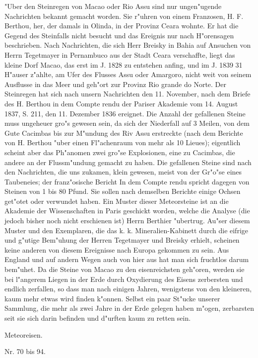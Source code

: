 \documentclass[a4paper, 11pt, oneside, polutonikogreek, german]{article}
\begin{document}
"Uber den Steinregen von Macao oder Rio Assu sind nur ungen"ugende Nachrichten bekannt gemacht worden. Sie r"uhren von einem Franzosen, H. F. Berthou, her, der damals in Olinda, in der Provinz Ceara wohnte. Er hat die Gegend des Steinfalls nicht besucht und das Ereignis nur nach H"orensagen beschrieben. Nach Nachrichten, die sich Herr Breisky in Bahia auf Ansuchen von Herrn Tegetmayer in Pernambuco aus der Stadt Ceara verschaffte, liegt das kleine Dorf Macao, das erst im J. 1828 zu entstehen anfing, und im J. 1839 31 H"auser z"ahlte, am Ufer des Flusses Assu oder Amargoro, nicht weit von seinem Ausflusse in das Meer und geh"ort zur Provinz Rio grande do Norte. Der Steinregen hat sich nach unsern Nachrichten den 11. November, nach dem Briefe des H. Berthou in dem Compte rendu der Pariser Akademie vom 14. August 1837, S. 211, den 11. Dezember 1836 ereignet. Die Anzahl der gefallenen Steine muss ungeheuer gro"s gewesen sein, da sich der Niederfall auf 3 Meilen, von dem Gute Cacimbas bis zur M"undung des Riv Assu erstreckte (nach dem Berichte von H. Berthou "uber einen Fl"achenraum von mehr als 10 Lieues); eigentlich scheint aber das Ph"anomen zwei gro"se Explosionen, eine zu Cacimbas, die andere an der Flussm"undung gemacht zu haben. Die gefallenen Steine sind nach den Nachrichten, die uns zukamen, klein gewesen, meist von der Gr"o"se eines Taubeneies; der franz"osische Bericht In dem Compte rendu spricht dagegen von Steinen von 1 bis 80 Pfund. Sie sollen nach demselben Berichte einige Ochsen get"otet oder verwundet haben. Ein Muster dieser Meteorsteine ist an die Akademie der Wissenschaften in Paris geschickt worden, welche die Analyse (die jedoch bisher noch nicht erschienen ist) Herrn Berthier "ubertrug. Au"ser diesem Muster und den Exemplaren, die das k. k. Mineralien-Kabinett durch die eifrige und g"utige Bem"uhung der Herren Tegetmayer und Breisky erhielt, scheinen keine anderen von diesem Ereignisse nach Europa gekommen zu sein. Aus England und auf andern Wegen auch von hier aus hat man sich fruchtlos darum bem"uhet. Da die Steine von Macao zu den eisenreichsten geh"oren, werden sie bei l"angerem Liegen in der Erde durch Oxydierung des Eisens zerbersten und endlich zerfallen, so dass man nach einigen Jahren, wenigstens von den kleineren, kaum mehr etwas wird finden k"onnen. Selbst ein paar St"ucke unserer Sammlung, die mehr als zwei Jahre in der Erde gelegen haben m"ogen, zerbarsten seit sie sich darin befinden und d"urften kaum zu retten sein.
\begin{center}
{\LARGE Meteoreisen.}

Nr. 70 bis 94.
\end{center}
\end{document}

